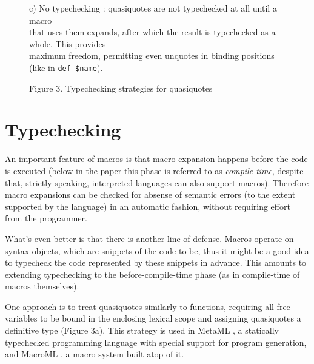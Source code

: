 \documentclass[10pt,journal,a4paper]{IEEEtran}
\begin{document}
\begin{figure*}[t]
\begin{listing}
\begin{adjustwidth}{2.5cm}{0pt}
c) No typechecking \cite{skalski05, skalski04}: quasiquotes are not typechecked at all until a
macro\\ that uses them expands, after which the result is typechecked as a whole. This provides\\
maximum freedom, permitting even unquotes in binding positions (like in \texttt{def \$name}).
\end{adjustwidth}

\end{listing}
\end{figure*}

\begin{figure*}
\hskip5.48cm
\normalsize Figure 3. Typechecking strategies for quasiquotes
\end{figure*}

\section{Typechecking}

An important feature of macros is that macro expansion happens before the code is executed (below in
the paper this phase is referred to as \emph{compile-time}, despite that, strictly speaking, interpreted
languages can also support macros). Therefore macro expansions can be checked for
absense of semantic errors (to the extent supported by the language) in an automatic fashion,
without requiring effort from the programmer.

What's even better is that there is another line of defense.
Macros operate on syntax objects, which are snippets of the code to be,
thus it might be a good idea to typecheck the code represented by these snippets
in advance. This amounts to extending typechecking to the before-compile-time phase
(as in compile-time of macros themselves).

One approach is to treat quasiquotes similarly to functions, requiring all free variables
to be bound in the enclosing lexical scope and assigning quasiquotes a definitive type (Figure 3a).
This strategy is used in MetaML \cite{taha99}, a statically typechecked
programming language with special support for program generation, and MacroML \cite{ganz01},
a macro system built atop of it.
\end{document}
